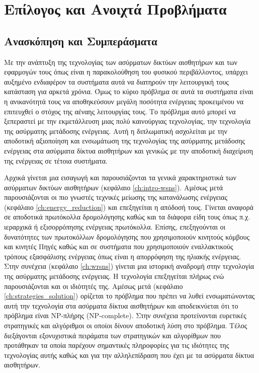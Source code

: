 

\chapter{Επίλογος και Ανοιχτά Προβλήματα}\label{ch:conclusion}
\section{Ανασκόπηση και Συμπεράσματα}
Με την ανάπτυξη της τεχνολογίας των ασύρματων δικτύων αισθητήρων και των εφαρμογών τους όπως είναι η παρακολούθηση του φυσικού περιβάλλοντος, υπάρχει αυξημένο
ενδιαφέρον τα συστήματα αυτά να διατηρούν την λειτουργική τους κατάσταση για αρκετά χρόνια. Όμως το κύριο πρόβλημα σε αυτά τα συστήματα είναι η ανικανότητά τους
να αποθηκεύσουν μεγάλη ποσότητα ενέργειας προκειμένου να επιτευχθεί ο στόχος της αέναης λειτουργίας τους. Το πρόβλημα αυτό μπορεί να ξεπεραστεί με την εκμετάλλευση
μιας πολύ καινούργιας τεχνολογίας, την τεχνολογία της ασύρματης μετάδοσης ενέργειας. Αυτή η διπλωματική ασχολείται με την αποδοτική αξιοποίηση και ενσωμάτωση της
τεχνολογίας της ασύρματης μετάδοσης ενέργειας στα ασύρματα δίκτυα αισθητήρων και γενικώς με την αποδοτική διαχείριση της ενέργειας σε τέτοια συστήματα.

Αρχικά γίνεται μια εισαγωγή και παρουσιάζονται τα γενικά χαρακτηριστικά των ασύρματων δικτύων αισθητήρων (κεφάλαιο \ref{ch:intro-wsns}). Αμέσως μετά παρουσιάζονται οι
πιο γνωστές τεχνικές μείωσης της κατανάλωσης ενέργειας (κεφάλαιο \ref{ch:energy_reduction}) και επεξηγείται η απόδοσή τους. Γίνεται αναφορά σε αποδοτικά
πρωτόκολλα δρομολόγησης καθώς και τα διάφορα είδη τους όπως π.χ. ιεραρχικά ή εξισορρόπησης ενέργειας πρωτόκολλα. Επίσης, επεξηγούνται οι δυνατότητες των πρωτοκόλλων
δρομολόγησης που χρησιμοποιούν κινητούς κόμβους και κινητές Πηγές καθώς και σε συστήματα που χρησιμοποιούν εναλλακτικούς τρόπους εξασφάλισης ενέργειας όπως είναι η
απορρόφηση της ηλιακής ενέργειας. Στην συνέχεια (κεφάλαιο \ref{ch:wrsns}) γίνεται μια ιστορική αναδρομή στην τεχνολογία της ασύρματης μετάδοσης ενέργειας. Η
τεχνολογία επεξηγείται πλήρως ενώ παρουσιάζονται και οι ιδιότητές της. Αμέσως μετά (κεφάλαιο \ref{ch:strategies_solution}) ορίζεται το πρόβλημα που πρέπει να λυθεί
ενσωματώνοντας αυτή την τεχνολογία στα ασύρματα δίκτυα αισθητήρων και αποδεικνύεται ότι το πρόβλημα είναι NP-πλήρης (NP-complete). Στην συνέχεια προτείνονται
ευρετικές στρατηγικές και αλγόριθμοι οι οποίοι δίνουν αποδοτική λύση στο πρόβλημα. Τέλος διεξάγονται εξονυχιστικά πειράματα των στρατηγικών και αλγορίθμων που
προτάθηκαν τα οποία παρέχουν σημαντικές πληροφορίες για τις ιδιότητες της τεχνολογίας αυτής καθώς και για την αλληλεπίδραση που έχει με τα ασύρματα δίκτυα αισθητήρων.

